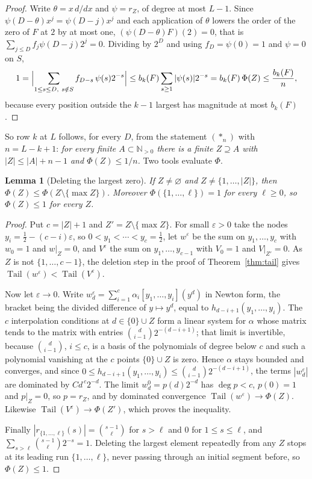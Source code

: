 \documentclass[11pt]{article}
\newtheorem{lemma}[theorem]{Lemma}
\newcommand{\N}{\mathbb N}
\DeclareMathOperator{\Tail}{Tail}
\begin{document}
\begin{proof}
Write $\theta=x\,d/dx$ and $\psi=r_Z$, of degree at most $L-1$.  Since
$\psi(D-\theta)x^j=\psi(D-j)x^j$ and each application of $\theta$ lowers the order
of the zero of $F$ at $2$ by at most one, $(\psi(D-\theta)F)(2)=0$, that is
$\sum_{j\le D}f_j\psi(D-j)2^{j}=0$.  Dividing by $2^D$ and using $f_D=\psi(0)=1$
and $\psi=0$ on $S$,
\[
  1=\Bigl|\sum_{1\le s\le D,\ s\notin S}f_{D-s}\,\psi(s)2^{-s}\Bigr|
   \le b_k(F)\sum_{s\ge1}|\psi(s)|2^{-s}=b_k(F)\,\Phi(Z)\le\frac{b_k(F)}n,
\]
because every position outside the $k-1$ largest has magnitude at most
$b_k(F)$.
\end{proof}

So row $k$ at $L$ follows, for every $D$, from the statement $(\ast_n)$ with
$n=L-k+1$: \emph{for every finite $A\subset\N_{>0}$ there is a finite
$Z\supseteq A$ with $|Z|\le|A|+n-1$ and $\Phi(Z)\le1/n$.}  Two tools
evaluate $\Phi$.

\begin{lemma}[Deleting the largest zero]\label{lem:confdel}
If $Z\ne\varnothing$ and $Z\ne\{1,\ldots,|Z|\}$, then
$\Phi(Z)\le\Phi(Z\setminus\{\max Z\})$.  Moreover
$\Phi(\{1,\ldots,\ell\})=1$ for every $\ell\ge0$, so $\Phi(Z)\le1$ for every
$Z$.
\end{lemma}

\begin{proof}
Put $c=|Z|+1$ and $Z'=Z\setminus\{\max Z\}$.  For small $\varepsilon>0$ take
the nodes $y_i=\tfrac12-(c-i)\varepsilon$, so $0<y_1<\cdots<y_c=\tfrac12$,
let $w^\varepsilon$ be the sum on $y_1,\ldots,y_c$ with $w_0=1$ and
$w|_Z=0$, and $V^\varepsilon$ the sum on $y_1,\ldots,y_{c-1}$ with $V_0=1$
and $V|_{Z'}=0$.  As $Z$ is not $\{1,\ldots,c-1\}$, the deletion step in the
proof of Theorem~\ref{thm:tail} gives $\Tail(w^\varepsilon)<\Tail(V^\varepsilon)$.

Now let $\varepsilon\to0$.  Write $w^\varepsilon_d=\sum_{i=1}^c\alpha_i
[y_1,\ldots,y_i](y^d)$ in Newton form, the bracket being the divided
difference of $y\mapsto y^d$, equal to $h_{d-i+1}(y_1,\ldots,y_i)$.  The
$c$ interpolation conditions at $d\in\{0\}\cup Z$ form a linear system for
$\alpha$ whose matrix tends to the matrix with entries
$\binom d{i-1}2^{-(d-i+1)}$; that limit is invertible, because
$\binom d{i-1}$, $i\le c$, is a basis of the polynomials of degree below
$c$ and such a polynomial vanishing at the $c$ points $\{0\}\cup Z$ is zero.
Hence $\alpha$ stays bounded and converges, and since
$0\le h_{d-i+1}(y_1,\ldots,y_i)\le\binom d{i-1}2^{-(d-i+1)}$, the terms
$|w^\varepsilon_d|$ are dominated by $Cd^{\,c}2^{-d}$.  The limit
$w^0_d=p(d)2^{-d}$ has $\deg p<c$, $p(0)=1$ and $p|_Z=0$, so $p=r_Z$, and by
dominated convergence $\Tail(w^\varepsilon)\to\Phi(Z)$.  Likewise
$\Tail(V^\varepsilon)\to\Phi(Z')$, which proves the inequality.

Finally $|r_{\{1,\ldots,\ell\}}(s)|=\binom{s-1}\ell$ for $s>\ell$ and $0$ for
$1\le s\le\ell$, and $\sum_{s>\ell}\binom{s-1}\ell2^{-s}=1$.  Deleting the
largest element repeatedly from any $Z$ stops at its leading run
$\{1,\ldots,\ell\}$, never passing through an initial segment before, so
$\Phi(Z)\le1$.
\end{proof}
\end{document}

